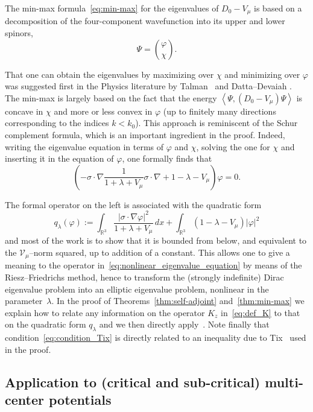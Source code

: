 \documentclass[10pt]{amsart}
\theoremstyle{definition}
\newcommand{\R}{\mathbb{R}}
\newcommand{\cV}{\mathcal{V}}
\newcommand\1{{\ensuremath {\mathds 1} }}
\renewcommand\phi{\varphi}
\newcommand\pscal[1]{{\ensuremath{\left\langle #1 \right\rangle}}}
\begin{document}
The min-max formula~\eqref{eq:min-max} for the eigenvalues of $D_0-V_\mu$ is based on a decomposition of the four-component wavefunction into its upper and lower spinors,
\[
\Psi=\binom{\phi}{\chi}.
\]

\goodbreak
\noindent That one can obtain the eigenvalues by maximizing over $\chi$ and minimizing over $\phi$ was suggested first in the Physics literature by Talman~\cite{Talman-86} and Datta--Devaiah \cite{DatDev-88}. The min-max is largely based on the fact that the energy $\pscal{\Psi,(D_0-V_\mu)\Psi}$ is concave in $\chi$ and more or less convex in $\phi$ (up to finitely many directions corresponding to the indices $k<k_0$). This approach is reminiscent of the Schur complement formula, which is an important ingredient in the proof. Indeed, writing the eigenvalue equation in terms of $\phi$ and $\chi$, solving the one for $\chi$ and inserting it in the equation of $\phi$, one formally finds that
\begin{equation}\label{eq:nonlinear_eigenvalue_equation}
\left(-\sigma\cdot \nabla\frac{1}{1+\lambda+V_\mu}\sigma\cdot \nabla+1-\lambda-V_\mu\right)\phi=0.
\end{equation}

The formal operator on the left is associated with the quadratic form
\begin{equation}\label{eq:def_q_lambda}
q_\lambda(\phi):=\int_{\R^3}\frac{|\sigma\cdot\nabla\phi|^2}{1+\lambda+V_\mu}\,dx+\int_{\R^3}\left(1-\lambda-V_\mu\right)|\phi|^2
\end{equation}
and most of the work is to show that it is bounded from below, and equivalent to the $\cV_\mu$--norm squared, up to addition of a constant. This allows one to give a meaning to the operator in~\eqref{eq:nonlinear_eigenvalue_equation} by means of the Riesz--Friedrichs method, hence to transform the (strongly indefinite) Dirac eigenvalue problem into an elliptic eigenvalue problem, nonlinear in the parameter~$\lambda$. In the proof of Theorems~\ref{thm:self-adjoint} and~\ref{thm:min-max} we explain how to relate any information on the operator $K_z$ in~\eqref{eq:def_K} to that on the quadratic form $q_\lambda$ and we then directly apply~\cite{DolEstSer-00,EstLewSer-19,SchSolTok-20}. Note finally that condition~\eqref{eq:condition_Tix} is directly related to an inequality due to Tix~\cite{Tix-98} used in the proof.

\subsection{Application to (critical and sub-critical) multi-center potentials}\label{sec:multicenter}
\end{document}
